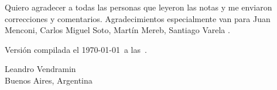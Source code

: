 Quiero agradecer a todas las personas que leyeron las notas y me enviaron 
correcciones y comentarios. Agradecimientos especialmente van para
Juan Menconi, 
Carlos Miguel Soto, 
Martín Mereb, 
Santiago Varela
.

\medskip
Versión compilada el \today~a las~\currenttime.

\begin{flushright} 
Leandro Vendramin\\Buenos Aires, Argentina\par
\end{flushright}